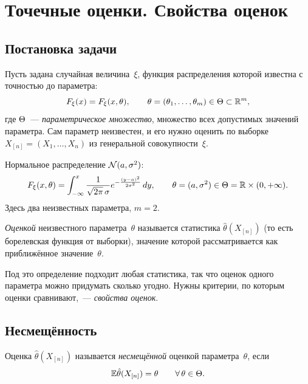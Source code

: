 \section{Точечные оценки. Свойства оценок}
\label{lec:06}

\subsection{Постановка задачи}
\label{lec06:setting}

Пусть задана случайная величина~$\xi$, функция распределения которой известна с точностью
до параметра:
\[
  F_\xi(x) = F_\xi(x, \theta), \qquad \theta = (\theta_1, \ldots, \theta_m) \in \Theta \subset \mathbb{R}^m,
\]
где $\Theta$~--- \emph{параметрическое множество}, множество всех допустимых значений параметра.
Сам параметр неизвестен, и его нужно оценить по выборке $X_{[n]} = (X_1, \ldots, X_n)$
из генеральной совокупности~$\xi$.

\begin{example}
  Нормальное распределение $\mathcal{N}(a, \sigma^2)$:
  \[
    F_\xi(x, \theta) = \int_{-\infty}^{x} \frac{1}{\sqrt{2\pi}\,\sigma}
                       e^{-\frac{(y - a)^2}{2\sigma^2}} \, dy, \qquad
    \theta = (a, \sigma^2) \in \Theta = \mathbb{R} \times (0, +\infty).
  \]
  Здесь два неизвестных параметра, $m = 2$.
\end{example}

\begin{definition}
  \emph{Оценкой} неизвестного параметра~$\theta$ называется статистика
  $\hat\theta(X_{[n]})$ (то есть борелевская функция от выборки), значение которой
  рассматривается как приближённое значение~$\theta$.
\end{definition}

Под это определение подходит любая статистика, так что оценок одного параметра можно
придумать сколько угодно. Нужны критерии, по которым оценки сравнивают,~--- \emph{свойства
оценок}.

\subsection{Несмещённость}
\label{lec06:unbiased}

\begin{definition}
  Оценка $\hat\theta(X_{[n]})$ называется \emph{несмещённой} оценкой параметра~$\theta$, если
  \[
    \mathbb{E} \hat\theta(X_{[n]}) = \theta \qquad \forall\, \theta \in \Theta.
  \]
\end{definition}

